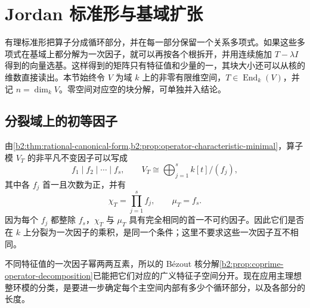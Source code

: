 
\section{Jordan 标准形与基域扩张}
\label{b2:sec:0405}

有理标准形把算子分成循环部分，并在每一部分保留一个关系多项式。如果这些多项式在基域上都分解为一次因子，就可以再按各个根拆开，并用连续施加 \(T-\lambda I\) 得到的向量选基。这样得到的矩阵只有特征值和少量的一，其块大小还可以从核的维数直接读出。本节始终令 \(V\) 为域 \(k\) 上的非零有限维空间，\(T\in\operatorname{End}_k(V)\)，并记 \(n=\dim_kV\)。零空间对应空的块分解，可单独并入结论。

%
%
%

\subsection{分裂域上的初等因子}
\label{b2:subsec:0405:01}

由\cref{b2:thm:rational-canonical-form,b2:prop:operator-characteristic-minimal}，算子模 \(V_T\) 的非平凡不变因子可以写成
\[
	f_1\mid f_2\mid\cdots\mid f_s,\qquad V_T\cong\bigoplus_{j=1}^s k[t]/(f_j),
\]
其中各 \(f_j\) 首一且次数为正，并有
\[
	\chi_T=\prod_{j=1}^s f_j,\qquad \mu_T=f_s.
\]
因为每个 \(f_j\) 都整除 \(f_s\)，\(\chi_T\) 与 \(\mu_T\) 具有完全相同的首一不可约因子。因此它们是否在 \(k\) 上分裂为一次因子的乘积，是同一个条件；这里不要求这些一次因子互不相同。

\ProseParagraphBreak
不同特征值的一次因子幂两两互素，所以的 Bézout 核分解\cref{b2:prop:coprime-operator-decomposition}已能把它们对应的广义特征子空间分开。现在应用主理想整环模的分类，是要进一步确定每个主空间内部有多少个循环部分，以及各部分的长度。

